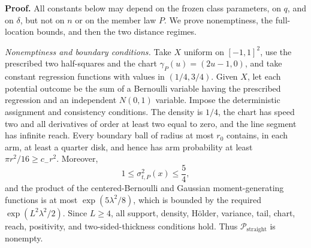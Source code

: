 \textbf{Proof.}
All constants below may depend on the frozen class parameters, on \(q\), and on \(\delta\), but not on \(n\) or on the member law \(P\).  We prove nonemptiness, the full-location bounds, and then the two distance regimes.

\emph{Nonemptiness and boundary conditions.}
Take \(X\) uniform on \([-1,1]^2\), use the prescribed two half-squares and the chart \(\gamma_P(u)=(2u-1,0)\), and take constant regression functions with values in \((1/4,3/4)\).  Given \(X\), let each potential outcome be the sum of a Bernoulli variable having the prescribed regression and an independent \(N(0,1)\) variable.  Impose the deterministic assignment and consistency conditions.  The density is \(1/4\), the chart has speed two and all derivatives of order at least two equal to zero, and the line segment has infinite reach.  Every boundary ball of radius at most \(r_0\) contains, in each arm, at least a quarter disk, and hence has arm probability at least \(\pi r^2/16\geq c_-r^2\).  Moreover,
\[
 1\leq \sigma^2_{t,P}(x)\leq \frac54,
\]
and the product of the centered-Bernoulli and Gaussian moment-generating functions is at most \(\exp(5\lambda^2/8)\), which is bounded by the required \(\exp(L^2\lambda^2/2)\).  Since \(L\geq4\), all support, density, H\"older, variance, tail, chart, reach, positivity, and two-sided-thickness conditions hold.  Thus \(\mathcal P_{\mathrm{straight}}\) is nonempty.

